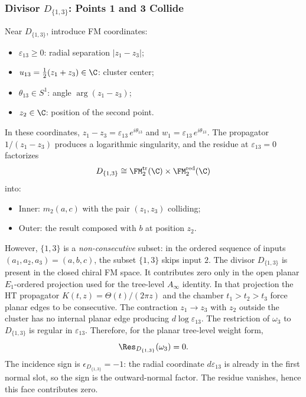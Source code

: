 \subsubsection{Divisor $D_{\{1,3\}}$: Points 1 and 3 Collide}

\begin{computation}[$D_{\{1,3\}}$ residue]
\label{comp:D13}
Near $D_{\{1,3\}}$, introduce FM coordinates:
\begin{itemize}
\item $\varepsilon_{13} \geq 0$: radial separation $|z_1 - z_3|$;
\item $u_{13} = \tfrac{1}{2}(z_1 + z_3) \in \C$: cluster center;
\item $\theta_{13} \in S^1$: angle $\arg(z_1 - z_3)$;
\item $z_2 \in \C$: position of the second point.
\end{itemize}
In these coordinates, $z_1 - z_3 = \varepsilon_{13}\, e^{i\theta_{13}}$ and $w_1 = \varepsilon_{13}\, e^{i\theta_{13}}$. The propagator $1/(z_1 - z_3)$ produces a logarithmic singularity, and the residue at $\varepsilon_{13} = 0$ factorizes
\[
D_{\{1,3\}}\cong
\FM_2^{\mathrm{tr}}(\C)\times\FM_2^{\mathrm{red}}(\C)
\]
into:
\begin{itemize}
\item Inner: $m_2(a, c)$ with the pair $(z_1, z_3)$ colliding;
\item Outer: the result composed with $b$ at position $z_2$.
\end{itemize}
However, \(\{1,3\}\) is a \emph{non-consecutive} subset: in the
ordered sequence of inputs \((a_1,a_2,a_3)=(a,b,c)\), the subset
\(\{1,3\}\) skips input \(2\).  The divisor \(D_{\{1,3\}}\) is present
in the closed chiral FM space.  It contributes zero only in the open
planar \(E_1\)-ordered projection used for the tree-level
\(A_\infty\) identity.  In that projection the HT propagator
\(K(t,z)=\Theta(t)/(2\pi z)\) and the chamber \(t_1>t_2>t_3\) force
planar edges to be consecutive.  The contraction \(z_1\to z_3\) with
\(z_2\) outside the cluster has no internal planar edge producing
\(d\log\varepsilon_{13}\).  The restriction of \(\omega_3\) to
\(D_{\{1,3\}}\) is regular in \(\varepsilon_{13}\).  Therefore, for
the planar tree-level weight form,
\[
\Res_{D_{\{1,3\}}}(\omega_3) = 0.
\]
The incidence sign is \(\epsilon_{D_{\{1,3\}}}=-1\): the radial
coordinate \(d\varepsilon_{13}\) is already in the first normal
slot, so the sign is the outward-normal factor.  The residue
vanishes, hence this face contributes zero.
\end{computation}

